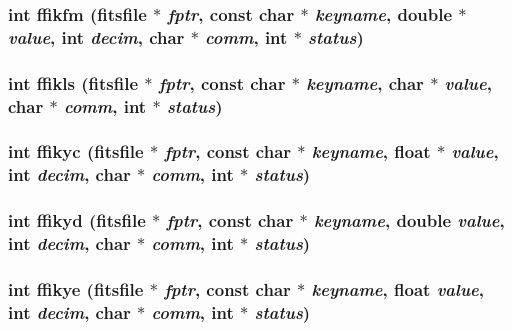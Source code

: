 \subsubsection{\setlength{\rightskip}{0pt plus 5cm}int ffikfm (\bf{fitsfile} $\ast$ {\em fptr}, const char $\ast$ {\em keyname}, double $\ast$ {\em value}, int {\em decim}, char $\ast$ {\em comm}, int $\ast$ {\em status})}\label{src_2fitsio_8h_a7af1984471fc7e31de5f5a5111407e4}


\subsubsection{\setlength{\rightskip}{0pt plus 5cm}int ffikls (\bf{fitsfile} $\ast$ {\em fptr}, const char $\ast$ {\em keyname}, char $\ast$ {\em value}, char $\ast$ {\em comm}, int $\ast$ {\em status})}\label{src_2fitsio_8h_b9a20f40733eee26b83630247c6c7d6c}


\subsubsection{\setlength{\rightskip}{0pt plus 5cm}int ffikyc (\bf{fitsfile} $\ast$ {\em fptr}, const char $\ast$ {\em keyname}, float $\ast$ {\em value}, int {\em decim}, char $\ast$ {\em comm}, int $\ast$ {\em status})}\label{src_2fitsio_8h_bf26af1c6bb6452cc6d4b4e9b794175c}


\subsubsection{\setlength{\rightskip}{0pt plus 5cm}int ffikyd (\bf{fitsfile} $\ast$ {\em fptr}, const char $\ast$ {\em keyname}, double {\em value}, int {\em decim}, char $\ast$ {\em comm}, int $\ast$ {\em status})}\label{src_2fitsio_8h_80b6addc96fa00ec452a71201de4c474}


\subsubsection{\setlength{\rightskip}{0pt plus 5cm}int ffikye (\bf{fitsfile} $\ast$ {\em fptr}, const char $\ast$ {\em keyname}, float {\em value}, int {\em decim}, char $\ast$ {\em comm}, int $\ast$ {\em status})}\label{src_2fitsio_8h_5be69827a5b1a21b310dc0e73e59c450}


